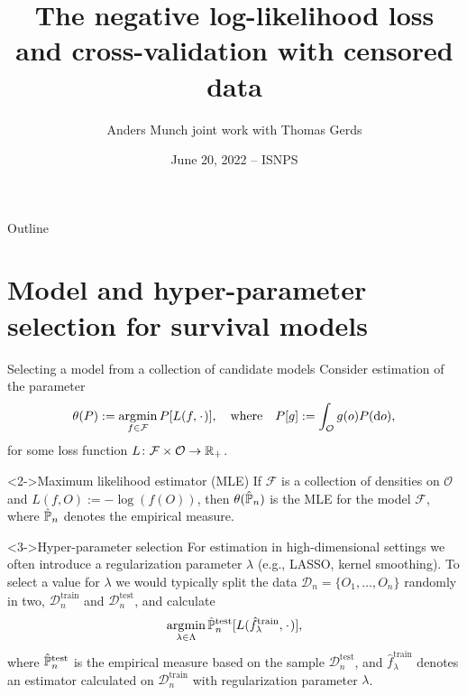 \documentclass[smaller]{beamer}\usepackage{listings}
\institute{PhD Student, Section of Biostatistics \\ University of Copenhagen}
\author{Anders Munch \newline \small joint work with Thomas Gerds}
\date{June 20, 2022 -- ISNPS}
\title{The negative log-likelihood loss and cross-validation with censored data}
\begin{document}
\maketitle
\begin{frame}{Outline}
\tableofcontents
\end{frame}

\section{Model and hyper-parameter selection for survival models}
\label{sec:org25a1b62}
\begin{frame}[label={sec:org9957c20}]{Selecting a model from a collection of candidate models}
\small Consider estimation of the parameter
\begin{equation*}
  \theta(P) := \argmin_{f \in\mathcal{F}} P[L(f, \blank)],
  \quad \text{where} \quad
  P[g] := \int_{\mathcal{O}}g(o) P(\diff o),
\end{equation*}
for some loss function $L \colon \mathcal{F} \times \mathcal{O} \rightarrow \mathbb{R}_+$.

\begin{exampleblock}<2->{\normalsize Maximum likelihood estimator (MLE)}
If \(\mathcal{F}\) is a collection of densities on \(\mathcal{O}\) and \(L(f, O) := -\log(f(O))\), then
\(\theta(\hat{\mathbb{P}}_n)\) is the MLE for the model \(\mathcal{F}\), where \(\hat{\mathbb{P}}_n\) denotes the empirical
measure.
\end{exampleblock}

\begin{exampleblock}<3->{\normalsize Hyper-parameter selection}
For estimation in high-dimensional settings we often introduce a regularization parameter $\lambda$
(e.g., LASSO, kernel smoothing). To select a value for $\lambda$ we would typically split the data
$\mathcal{D}_n = \{O_1, \dots, O_n\}$ randomly in two, $\mathcal{D}_n^{\mathrm{train}}$ and $\mathcal{D}_n^{\mathrm{test}}$, and
calculate
\begin{equation*}
\argmin_{\lambda\in\Lambda} \empmeas^{\mathrm{test}}[L(\hat{f}^{\mathrm{train}}_{\lambda}, \blank)],
\end{equation*}
where $\hat{\mathbb{P}}_n^{\mathrm{test}}$ is the empirical measure based on the sample $\mathcal{D}_n^{\mathrm{test}}$, and
$\hat{f}^{\mathrm{train}}_{\lambda}$ denotes an estimator calculated on $\mathcal{D}_n^{\mathrm{train}}$ with regularization
parameter $\lambda$.
\end{exampleblock}
\end{frame}
\end{document}

